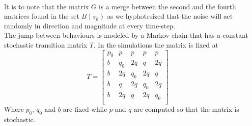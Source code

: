 \documentclass[twocolumn]{article}
\begin{document}
    \\
    It is to note that the matrix $G$ is a merge between the second and the fourth matrices found in the set $B(s_{k})$ as we hyphotesized that 
     the noise will act randomly in direction and magnitude at every time-step.
\\
The jump between behaviours is modeled by a Markov chain that has a constant stochastic transition matrix $T$.
In the simulations the matrix is fixed at
\begin{equation*}
    T=\begin{bmatrix}
        p_{0}&p&p&p&p\\
        b&q_{0}&2q&q&2q\\
        b&2q&q_{0}&2q&q\\
        b&q&2q&q_{0}&2q\\
        b&2q&q&2q&q_{0}\\
    \end{bmatrix}
\end{equation*}
Where $p_{0}$, $q_{0}$ and $b$ are fixed while $p$ and $q$ are computed so that the matrix is stochastic.
\end{document}
